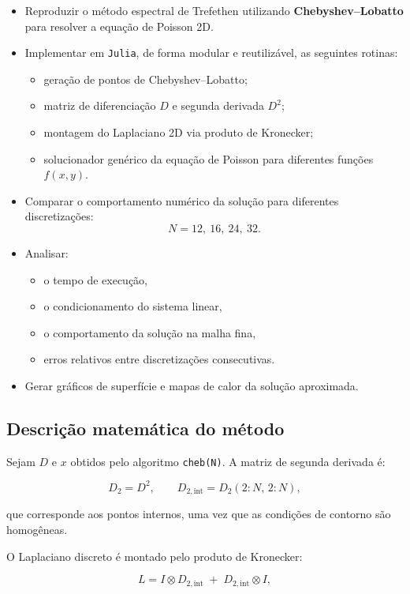 \documentclass[12pt,a4paper]{article}
\begin{document}
\begin{itemize}
    \item Reproduzir o método espectral de Trefethen utilizando \textbf{Chebyshev–Lobatto} para resolver a equação de Poisson 2D.
    \item Implementar em \texttt{Julia}, de forma modular e reutilizável, as seguintes rotinas:
    \begin{itemize}
        \item geração de pontos de Chebyshev–Lobatto;
        \item matriz de diferenciação $D$ e segunda derivada $D^2$;
        \item montagem do Laplaciano 2D via produto de Kronecker;
        \item solucionador genérico da equação de Poisson para diferentes funções $f(x,y)$.
    \end{itemize}
    \item Comparar o comportamento numérico da solução para diferentes discretizações:
    \[
    N = 12,\ 16,\ 24,\ 32.
    \]
    \item Analisar:
    \begin{itemize}
        \item o tempo de execução,
        \item o condicionamento do sistema linear,
        \item o comportamento da solução na malha fina,
        \item erros relativos entre discretizações consecutivas.
    \end{itemize}
    \item Gerar gráficos de superfície e mapas de calor da solução aproximada.
\end{itemize}

\subsection{Descrição matemática do método}

Sejam $D$ e $x$ obtidos pelo algoritmo \texttt{cheb(N)}. A matriz de segunda derivada é:

\[
D_2 = D^2,
\qquad
D_{2,\text{int}} = D_2(2\!:\!N,\, 2\!:\!N),
\]

que corresponde aos pontos internos, uma vez que as condições de contorno são homogêneas.

O Laplaciano discreto é montado pelo produto de Kronecker:

\[
L = I \otimes D_{2,\text{int}} \;+\; D_{2,\text{int}} \otimes I,
\]
\end{document}
